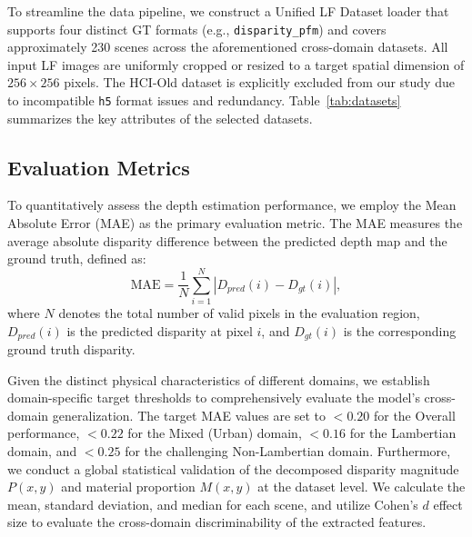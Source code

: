 To streamline the data pipeline, we construct a Unified LF Dataset loader that supports four distinct GT formats (e.g., \texttt{disparity\_pfm}) and covers approximately 230 scenes across the aforementioned cross-domain datasets. All input LF images are uniformly cropped or resized to a target spatial dimension of $256 \times 256$ pixels. The HCI-Old dataset is explicitly excluded from our study due to incompatible \texttt{h5} format issues and redundancy. Table~\ref{tab:datasets} summarizes the key attributes of the selected datasets.

\begin{table}[!t]
\centering
\caption{Summary of Light Field Datasets Used in Experiments}
\label{tab:datasets}
\end{table}

\subsection{Evaluation Metrics}
To quantitatively assess the depth estimation performance, we employ the Mean Absolute Error (MAE) as the primary evaluation metric. The MAE measures the average absolute disparity difference between the predicted depth map and the ground truth, defined as:
\begin{equation}
\text{MAE} = \frac{1}{N} \sum_{i=1}^{N} |D_{pred}(i) - D_{gt}(i)|,
\label{eq:mae}
\end{equation}
where $N$ denotes the total number of valid pixels in the evaluation region, $D_{pred}(i)$ is the predicted disparity at pixel $i$, and $D_{gt}(i)$ is the corresponding ground truth disparity. 

Given the distinct physical characteristics of different domains, we establish domain-specific target thresholds to comprehensively evaluate the model's cross-domain generalization. The target MAE values are set to $< 0.20$ for the Overall performance, $< 0.22$ for the Mixed (Urban) domain, $< 0.16$ for the Lambertian domain, and $< 0.25$ for the challenging Non-Lambertian domain. Furthermore, we conduct a global statistical validation of the decomposed disparity magnitude $P(x,y)$ and material proportion $M(x,y)$ at the dataset level. We calculate the mean, standard deviation, and median for each scene, and utilize Cohen's $d$ effect size to evaluate the cross-domain discriminability of the extracted features.

